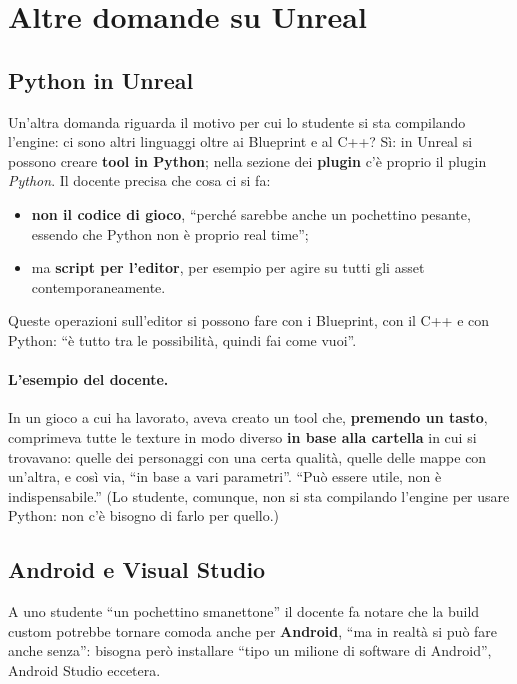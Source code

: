 \section{Altre domande su Unreal}
\label{gd12:sec:altre-domande}

\subsection{Python in Unreal}

Un'altra domanda riguarda il motivo per cui lo studente si sta compilando
l'engine: ci sono altri linguaggi oltre ai Blueprint e al C++? Sì: in Unreal si
possono creare \textbf{tool in Python}; nella sezione dei \textbf{plugin}
c'è proprio il plugin \emph{Python}. Il docente precisa che cosa ci si fa:
\begin{itemize}
  \item \textbf{non il codice di gioco}, ``perché sarebbe anche un pochettino
        pesante, essendo che Python non è proprio real time'';
  \item ma \textbf{script per l'editor}, per esempio per agire su tutti gli
        asset contemporaneamente.
\end{itemize}
Queste operazioni sull'editor si possono fare con i Blueprint, con il C++ e con
Python: ``è tutto tra le possibilità, quindi fai come vuoi''.

\paragraph{L'esempio del docente.} In un gioco a cui ha lavorato, aveva creato
un tool che, \textbf{premendo un tasto}, comprimeva tutte le texture in modo
diverso \textbf{in base alla cartella} in cui si trovavano: quelle dei
personaggi con una certa qualità, quelle delle mappe con un'altra, e così via,
``in base a vari parametri''. ``Può essere utile, non è indispensabile.'' (Lo
studente, comunque, non si sta compilando l'engine per usare Python: non c'è
bisogno di farlo per quello.)

\subsection{Android e Visual Studio}

A uno studente ``un pochettino smanettone'' il docente fa notare che la build
custom potrebbe tornare comoda anche per \textbf{Android}, ``ma in realtà si può
fare anche senza'': bisogna però installare ``tipo un milione di software di
Android'', Android Studio eccetera.

